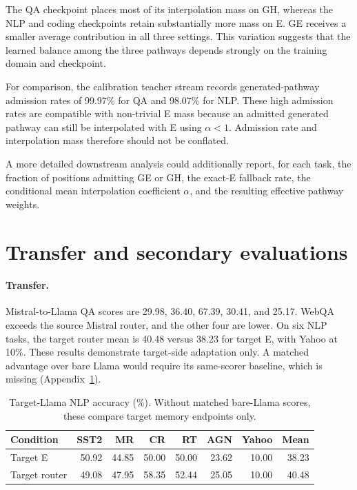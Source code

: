 The QA checkpoint places most of its interpolation mass on GH, whereas the NLP
and coding checkpoints retain substantially more mass on E. GE receives a
smaller average contribution in all three settings. This variation suggests
that the learned balance among the three pathways depends strongly on the
training domain and checkpoint.

For comparison, the calibration teacher stream records generated-pathway
admission rates of 99.97\% for QA and 98.07\% for NLP. These high admission
rates are compatible with non-trivial E mass because an admitted generated
pathway can still be interpolated with E using $\alpha<1$. Admission rate and
interpolation mass therefore should not be conflated.

A more detailed downstream analysis could additionally report, for each task,
the fraction of positions admitting GE or GH, the exact-E fallback rate, the
conditional mean interpolation coefficient $\alpha$, and the resulting
effective pathway weights.
\section{Transfer and secondary evaluations}
\label{app:transfer}

\paragraph{Transfer.}
Mistral-to-Llama QA scores are 29.98, 36.40, 67.39, 30.41, and 25.17. WebQA exceeds the source Mistral router, and the other four are lower. On six NLP tasks, the target router mean is 40.48 versus 38.23 for target E, with Yahoo at 10\%. These results demonstrate target-side adaptation only. A matched advantage over bare Llama would require its same-scorer baseline, which is missing (Appendix~\ref{app:transfer}).



\begin{table}[h]
\centering
\caption{Target-Llama NLP accuracy (\%). Without matched bare-Llama scores, these compare target memory endpoints only.}
\small
\begin{tabular}{lrrrrrrr}
\toprule
Condition & SST2 & MR & CR & RT & AGN & Yahoo & Mean\\
\midrule
Target E &50.92&44.85&50.00&50.00&23.62&10.00&38.23\\
Target router &49.08&47.95&58.35&52.44&25.05&10.00&40.48\\
\bottomrule
\end{tabular}
\end{table}

